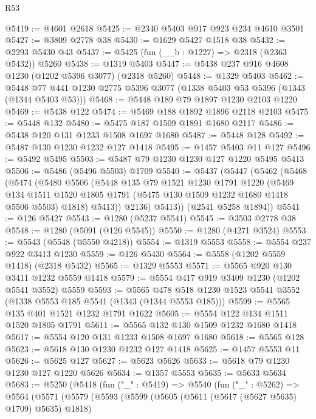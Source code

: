 \begin{lexlean}{R53}
\begin{coremodule}
@5419 := @4601 @2618
@5425 := @2340 @5403 @917 @923 @234 @4610 @3501
@5427 := @3809 @2778 @38
@5430 := @1629 @5427 @1518 @38
@5432 := @2293 @5430 @43
@5437 := @5425 (fun (__b : @1227) => @2318 (@2363 @5432)) @5260
@5438 := @1319 @5403
@5447 := @5438 @237 @916 @4608 @1230 (@1202 @5396 @3077) (@2318 @5260)
@5448 := @1329 @5403
@5462 := @5448 @77 @441 @1230 @2775 @5396 @3077 (@1338 @5403 @53 @5396 (@1343 (@1344 @5403 @53)))
@5468 := @5448 @189 @79 @1897 @1230 @2103 @1220
@5469 := @5438 @122
@5474 := @5469 @188 @1892 @1896 @2118 @2103
@5475 := @5448 @132
@5480 := @5475 @187 @1509 @1891 @1680 @2117
@5486 := @5438 @120 @131 @1233 @1508 @1697 @1680
@5487 := @5448 @128
@5492 := @5487 @130 @1230 @1232 @127 @1418
@5495 := @1457 @5403 @11 @127
@5496 := @5492 @5495
@5503 := @5487 @79 @1230 @1230 @127 @1220 @5495 @5413
@5506 := @5486 (@5496 @5503) @1709
@5540 := @5437
    (@5447
      (@5462
        (@5468
          (@5474
            (@5480
              @5506
              (@5448
                @135
                @79
                @1521
                @1230
                @1791
                @1220
                (@5469
                  @134
                  @1511
                  @1520
                  @1805
                  @1791
                  (@5475 @130 @1509 @1232 @1680 @1418 @5506 @5503)
                  @1818)
                @5413))
            @2136)
          @5413))
      (@2541 @5258 @1894))
@5541 := @126 @5427
@5543 := @1280 (@5237 @5541)
@5545 := @3503 @2778 @38
@5548 := @1280 (@5091 (@126 @5545))
@5550 := @1280 (@4271 @3524)
@5553 := @5543 (@5548 (@5550 @4218))
@5554 := @1319 @5553
@5558 := @5554 @237 @922 @3413 @1230
@5559 := @126 @5430
@5564 := @5558 (@1202 @5559 @1418) (@2318 @5432)
@5565 := @1329 @5553
@5571 := @5565 @920 @130 @3411 @1232 @5559 @1418
@5579 := @5554 @417 @919 @3409 @1230 (@1202 @5541 @3552) @5559
@5593 := @5565 @478 @518 @1230 @1523 @5541 @3552 (@1338 @5553 @185 @5541 (@1343 (@1344 @5553 @185)))
@5599 := @5565 @135 @401 @1521 @1232 @1791 @1622
@5605 := @5554 @122 @134 @1511 @1520 @1805 @1791
@5611 := @5565 @132 @130 @1509 @1232 @1680 @1418
@5617 := @5554 @120 @131 @1233 @1508 @1697 @1680
@5618 := @5565 @128
@5623 := @5618 @130 @1230 @1232 @127 @1418
@5625 := @1457 @5553 @11
@5626 := @5625 @127
@5627 := @5623 @5626
@5633 := @5618 @79 @1230 @1230 @127 @1220 @5626
@5634 := @1357 @5553
@5635 := @5633 @5634
@5683 := @5250
    (@5418
      (fun ("_" : @5419) =>
      @5540
        (fun ("_" : @5262) =>
        @5564
          (@5571
            (@5579
              (@5593
                (@5599
                  (@5605 (@5611 (@5617 (@5627 @5635) @1709) @5635) @1818)

\end{coremodule}
\end{lexlean}
